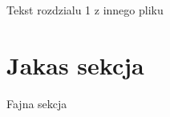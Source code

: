 \documentclass[../main.tex]{subfiles}
\begin{document}
Tekst rozdzialu 1 z innego pliku
\section{Jakas sekcja}
Fajna sekcja
\end{document}
